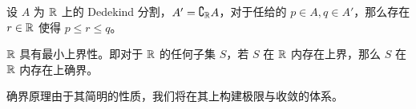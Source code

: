 \begin{axiom}[Dedekind 原理]
	设 $A$ 为 $\mathbb{R}$ 上的 Dedekind 分割，$A' = \complement_{\mathbb{R}} A$，对于任给的 $p\in A,q \in A'$，那么存在 $r \in \mathbb{R}$ 使得 $p \leqslant r \leqslant q$。
\end{axiom}

\begin{axiom}[确界原理]
	$\mathbb{R}$ 具有最小上界性。即对于 $\mathbb{R}$ 的任何子集 $S$，若 $S$ 在 $\mathbb{R}$ 内存在上界，那么 $S$ 在 $\mathbb{R}$ 内存在上确界。
\end{axiom}

确界原理由于其简明的性质，我们将在其上构建极限与收敛的体系。







%
%
%
%
%
%
%
%
%	
%	
%
%
